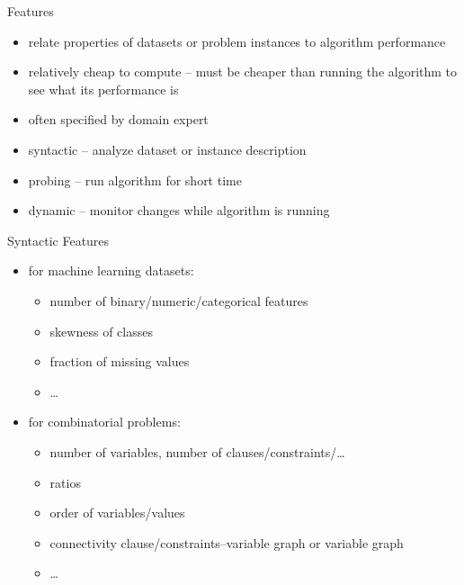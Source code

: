 \begin{frame}{Features}
\begin{itemize}
\item relate properties of datasets or problem instances to algorithm performance
\item relatively cheap to compute -- must be cheaper than running the algorithm
    to see what its performance is
\item often specified by domain expert
\item syntactic -- analyze dataset or instance description
\item probing -- run algorithm for short time
\item dynamic -- monitor changes while algorithm is running
\end{itemize}
\end{frame}

\begin{frame}{Syntactic Features}
\begin{itemize}
    \item for machine learning datasets:
        \begin{itemize}
            \item number of binary/numeric/categorical features
            \item skewness of classes
            \item fraction of missing values
            \item \ldots
        \end{itemize}
    \item for combinatorial problems:
        \begin{itemize}
            \item number of variables, number of clauses/constraints/\ldots
            \item ratios
            \item order of variables/values
            \item connectivity clause/constraints--variable graph or variable graph
            \item \ldots
        \end{itemize}
\end{itemize}
\end{frame}

